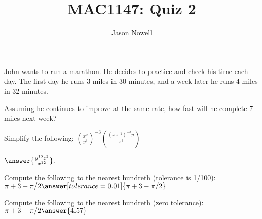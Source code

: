 \documentclass{ximera}
\title{MAC1147: Quiz 2}
\author{Jason Nowell}
\begin{document}
\maketitle

\begin{problem}
John wants to run a marathon. He decides to practice and check his time each day. The first day he runs 3 miles in 30 minutes, and a week later he runs 4 miles in 32 minutes.

Assuming he continues to improve at the same rate, how fast will he complete 7 miles next week?
\begin{multipleChoice}
\end{multipleChoice}
\end{problem}

\begin{problem}
Simplify the following: $\left(\frac{x^2}{y^3}\right)^{-3}\left(\frac{(xz^{-1})^{-3}y}{x^3}\right)$

$\answer{\frac{y^{10}z^3}{x^{12}}}$.
\end{problem}

\begin{problem}
Compute the following to the nearest hundreth (tolerance is 1/100):
    $\pi + 3 - \pi/2 \answer[tolerance=0.01]{\pi + 3 - \pi/2}$
\end{problem}

\begin{problem}
Compute the following to the nearest hundreth (zero tolerance):
    $\pi + 3 - \pi/2 \answer{4.57}$
\end{problem}
\end{document}
